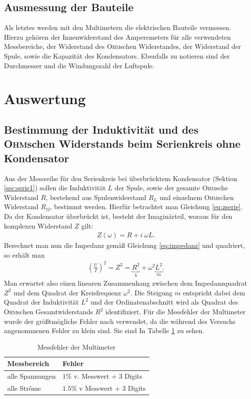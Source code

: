 \documentclass[12pt,a4paper,titlepage,headinclude]{scrartcl}
\numberwithin{equation}{subsection}
\newcommand{\person}[1]{\textsc{#1}}
\begin{document}
\subsection{Ausmessung der Bauteile}
Als letztes werden mit den Multimetern die elektrischen Bauteile vermessen. Hierzu gehören der Innenwiderstand des Amperemeters für alle verwendeten Messbereiche, der Widerstand des \person{Ohm}schen Widerstandes, der Widerstand der Spule, sowie die Kapazität des Kondensators. Ebenfalls zu notieren sind der Durchmesser und die Windungszahl der Luftspule.
\section{Auswertung}
\label{sec:auswertung}
\subsection{Bestimmung der Induktivität und des \person{Ohm}schen Widerstands beim Serienkreis ohne Kondensator}
\label{sec:lin}
Aus der Messreihe für den Serienkreis bei überbrücktem Kondensator (Sektion \ref{sec:serie1}) sollen die Induktivität $L$ der Spule, sowie der gesamte \person{Ohm}sche Widerstand $R$, bestehend aus Spulenwiderstand $R_L$ und einzelnem \person{Ohm}schen Widerstand $R_\Omega$, bestimmt werden. Hierfür betrachtet man Gleichung \eqref{eq:zserie}. Da der Kondensator überbrückt ist, besteht der Imaginärteil, woraus für den komplexen Widerstand $Z$ gilt:
\begin{align}
	Z(\omega)=R+i~\omega L.
	\label{eq:impedRL}
\end{align}
Berechnet man nun die Impedanz gemäß Gleichung \eqref{eq:impedanz} und quadriert, so erhält man
\begin{align}
	\left( \frac{U}{I} \right)^2=Z^2=\underbrace{R^2}_b+\omega^2 \underbrace{L^2}_m.
	\label{eq:gerade}
\end{align}
Man erwartet also einen linearen Zusammenhang zwischen dem Impedanzquadrat $Z^2$ und dem Quadrat der Kreisfrequenz $\omega^2$. Die Steigung $m$ entspricht dabei dem Quadrat der Induktivität $L^2$ und der Ordinatenabschnitt wird als Quadrat des \person{Ohm}schen Gesamtwiderstands $R^2$ identifiziert.
Für die Messfehler der Multimeter wurde der größtmögliche Fehler nach \cite[35]{prakti} verwendet, da die während des Versuchs angenommenen Fehler zu klein sind. Sie sind In Tabelle \ref{tab:messfehler} zu sehen.
\begin{table}
	\centering
	\begin{tabular}{l|l}
		\hline
		Messbereich&Fehler\\\hline
		alle Spannungen&$1\%$ v. Messwert + 3 Digits\\
		alle Ströme&$1.5\%$ v Messwert + 3 Digits\\\hline
	\end{tabular}
	\caption{Messfehler der Multimeter}
	\label{tab:messfehler}
\end{table}
\end{document}
